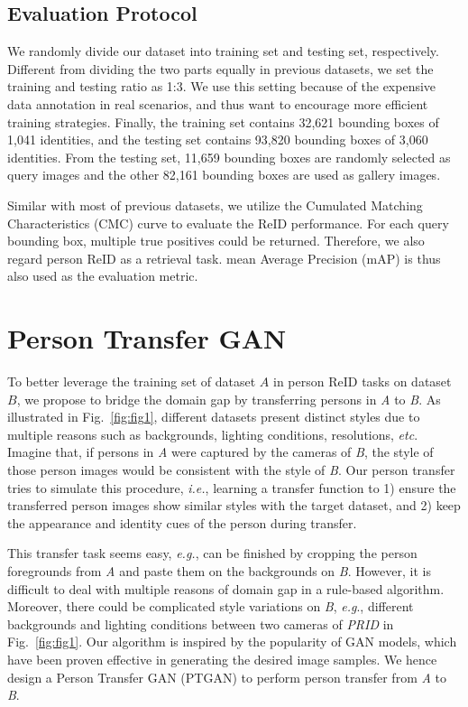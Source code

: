 \documentclass[10pt,twocolumn,letterpaper]{article}
\begin{document}
\subsection{Evaluation Protocol}
\label{sec:evaluationProtocol}

We randomly divide our dataset into training set and testing set, respectively. Different from dividing the two parts equally in previous datasets, we set the training and testing ratio as 1:3. We use this setting because of the expensive data annotation in real scenarios, and thus want to encourage more efficient training strategies. Finally, the training set contains 32,621 bounding boxes of 1,041 identities, and the testing set contains 93,820 bounding boxes of 3,060 identities. From the testing set, 11,659 bounding boxes are randomly selected as query images and the other 82,161 bounding boxes are used as gallery images.

Similar with most of previous datasets, we utilize the Cumulated Matching Characteristics (CMC) curve to evaluate the ReID performance. For each query bounding box, multiple true positives could be returned. Therefore, we also regard person ReID as a retrieval task. mean Average Precision (mAP) is thus also used as the evaluation metric.

\section{Person Transfer GAN}

To better leverage the training set of dataset $A$ in person ReID tasks on dataset $B$, we propose to bridge the domain gap by transferring persons in \emph{A} to \emph{B}. As illustrated in Fig.~\ref{fig:fig1}, different datasets present distinct styles due to multiple reasons such as backgrounds, lighting conditions, resolutions, \emph{etc}. Imagine that, if persons in \emph{A} were captured by the cameras of \emph{B}, the style of those person images would be consistent with the style of \emph{B}. Our person transfer tries to simulate this procedure, \emph{i.e.}, learning a transfer function to 1) ensure the transferred person images show similar styles with the target dataset, and 2) keep the appearance and identity cues of the person during transfer.

This transfer task seems easy, \emph{e.g.}, can be finished by cropping the person foregrounds from \emph{A} and paste them on the backgrounds on \emph{B}. However, it is difficult to deal with multiple reasons of domain gap in a rule-based algorithm. Moreover, there could be complicated style variations on \emph{B}, \emph{e.g}., different backgrounds and lighting conditions between two cameras of \emph{PRID} in Fig.~\ref{fig:fig1}. Our algorithm is inspired by the popularity of GAN models, which have been proven effective in generating the desired image samples. We hence design a Person Transfer GAN (PTGAN) to perform person transfer from \emph{A} to \emph{B}.
\end{document}
